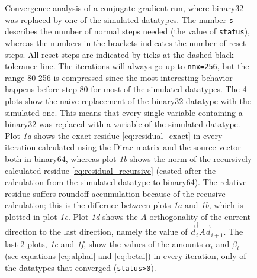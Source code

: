 \documentclass{article}
\theoremstyle{plain} %
\theoremstyle{remark} %
\def\code#1{\texttt{#1}}
\numberwithin{equation}{section}
\begin{document}
\begin{figure}
    \caption{Convergence analysis of a conjugate gradient run, where \gls{binary32} was replaced by one of the simulated datatypes. The number \code{s} describes the number of normal steps needed (the value of \code{status}), whereas the numbers in the brackets indicates the number of reset steps. All reset steps are indicated by ticks at the dashed black tolerance line. The iterations will always go up to \code{nmx=256}, but the range \num{80}-\num{256} is compressed since the most interesting behavior happens before step \num{80} for most of the simulated datatypes. The 4 plots show the naive replacement of the \gls{binary32} datatype with the simulated one. This means that every single variable containing a \gls{binary32} was replaced with a variable of the simulated datatype. Plot \textit{1a} shows the exact residue \eqref{eq:residual_exact} in every iteration calculated using the Dirac matrix and the source vector both in \gls{binary64}, whereas plot \textit{1b} shows the norm of the recursively calculated residue \eqref{eq:residual_recursive} (casted after the calculation from the simulated datatype to \gls{binary64}). The relative residue suffers roundoff accumulation because of the recusive calculation; this is the differnce between plots \textit{1a} and \textit{1b}, which is plotted in plot \textit{1c}. Plot \textit{1d} shows the $A$-orthogonality of the current direction to the last direction, namely the value of $\vec{d}_{i}^\dagger A \vec{d}_{i+1}$. The last 2 plots, \textit{1e} and \textit{1f}, show the values of the amounts $\alpha_i$ and $\beta_i$ (see equations \eqref{eq:alphai} and \eqref{eq:betai}) in every iteration, only of the datatypes that converged (\code{status>0}).}
    \label{fig:cgne:naive}
\end{figure}
\end{document}
